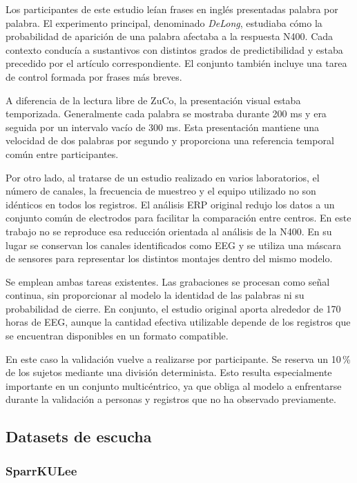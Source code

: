 Los participantes de este estudio leían frases en inglés presentadas palabra por palabra. El experimento principal, denominado \textit{DeLong}, estudiaba cómo la probabilidad de aparición de una palabra afectaba a la respuesta N400. Cada contexto conducía a sustantivos con distintos grados de predictibilidad y estaba precedido por el artículo correspondiente. El conjunto también incluye una tarea de control formada por frases más breves.

A diferencia de la lectura libre de ZuCo, la presentación visual estaba temporizada. Generalmente cada palabra se mostraba durante 200 ms y era seguida por un intervalo vacío de 300 ms. Esta presentación mantiene una velocidad de dos palabras por segundo y proporciona una referencia temporal común entre participantes.

Por otro lado, al tratarse de un estudio realizado en varios laboratorios, el número de canales, la frecuencia de muestreo y el equipo utilizado no son idénticos en todos los registros. El análisis ERP original redujo los datos a un conjunto común de electrodos para facilitar la comparación entre centros. En este trabajo no se reproduce esa reducción orientada al análisis de la N400. En su lugar se conservan los canales identificados como EEG y se utiliza una máscara de sensores para representar los distintos montajes dentro del mismo modelo.

Se emplean ambas tareas existentes. Las grabaciones se procesan como señal continua, sin proporcionar al modelo la identidad de las palabras ni su probabilidad de cierre. En conjunto, el estudio original aporta alrededor de 170 horas de EEG, aunque la cantidad efectiva utilizable depende de los registros que se encuentran disponibles en un formato compatible.

En este caso la validación vuelve a realizarse por participante. Se reserva un 10\,\% de los sujetos mediante una división determinista. Esto resulta especialmente importante en un conjunto multicéntrico, ya que obliga al modelo a enfrentarse durante la validación a personas y registros que no ha observado previamente.

\subsection{Datasets de escucha}

\subsubsection{SparrKULee}

